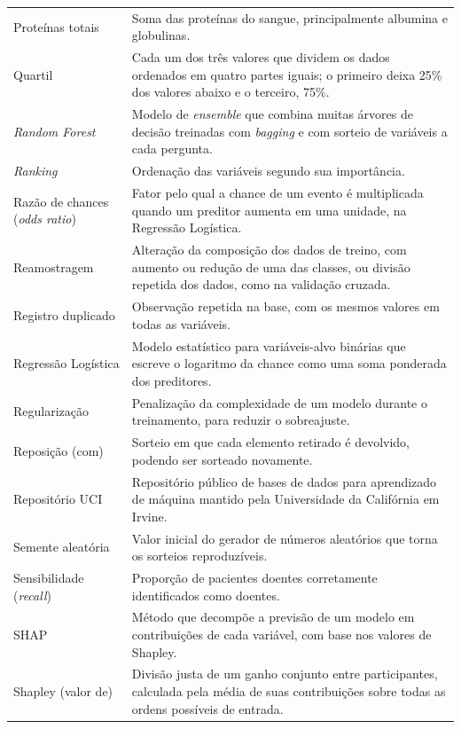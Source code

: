 \begin{longtable}{@{}p{3.8cm}p{10.7cm}@{}}
Proteínas totais & Soma das proteínas do sangue, principalmente albumina e globulinas. \\[0.15cm]
Quartil & Cada um dos três valores que dividem os dados ordenados em quatro partes iguais; o primeiro deixa 25\% dos valores abaixo e o terceiro, 75\%. \\[0.15cm]
\textit{Random Forest} & Modelo de \textit{ensemble} que combina muitas árvores de decisão treinadas com \textit{bagging} e com sorteio de variáveis a cada pergunta. \\[0.15cm]
\textit{Ranking} & Ordenação das variáveis segundo sua importância. \\[0.15cm]
Razão de chances (\textit{odds ratio}) & Fator pelo qual a chance de um evento é multiplicada quando um preditor aumenta em uma unidade, na Regressão Logística. \\[0.15cm]
Reamostragem & Alteração da composição dos dados de treino, com aumento ou redução de uma das classes, ou divisão repetida dos dados, como na validação cruzada. \\[0.15cm]
Registro duplicado & Observação repetida na base, com os mesmos valores em todas as variáveis. \\[0.15cm]
Regressão Logística & Modelo estatístico para variáveis-alvo binárias que escreve o logaritmo da chance como uma soma ponderada dos preditores. \\[0.15cm]
Regularização & Penalização da complexidade de um modelo durante o treinamento, para reduzir o sobreajuste. \\[0.15cm]
Reposição (com) & Sorteio em que cada elemento retirado é devolvido, podendo ser sorteado novamente. \\[0.15cm]
Repositório UCI & Repositório público de bases de dados para aprendizado de máquina mantido pela Universidade da Califórnia em Irvine. \\[0.15cm]
Semente aleatória & Valor inicial do gerador de números aleatórios que torna os sorteios reproduzíveis. \\[0.15cm]
Sensibilidade (\textit{recall}) & Proporção de pacientes doentes corretamente identificados como doentes. \\[0.15cm]
SHAP & Método que decompõe a previsão de um modelo em contribuições de cada variável, com base nos valores de Shapley. \\[0.15cm]
Shapley (valor de) & Divisão justa de um ganho conjunto entre participantes, calculada pela média de suas contribuições sobre todas as ordens possíveis de entrada. \\[0.15cm]

\end{longtable}
